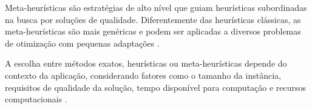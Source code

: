 Meta-heurísticas são estratégias de alto nível que guiam heurísticas subordinadas na busca 
por soluções de qualidade. Diferentemente das heurísticas clássicas, as meta-heurísticas são 
mais genéricas e podem ser aplicadas a diversos problemas de otimização com pequenas 
adaptações \cite{RUSSELL2013}.

A escolha entre métodos exatos, heurísticas ou meta-heurísticas depende do contexto da 
aplicação, considerando fatores como o tamanho da instância, requisitos de qualidade da 
solução, tempo disponível para computação e recursos computacionais \cite{CORMEN2012}.





    
    
